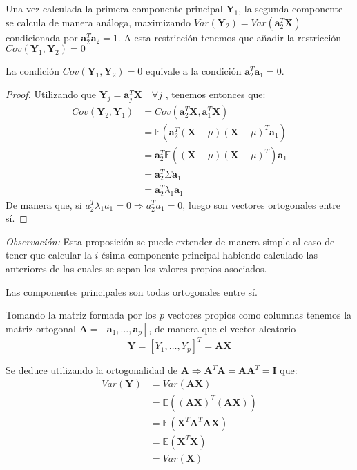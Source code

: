 \noindent Una vez calculada la primera componente principal $\textbf{Y}_1$, la segunda componente se calcula de manera análoga, maximizando $Var(\textbf{Y}_2)=Var(\textbf{a}_2^T\textbf{X})$ condicionada por $\textbf{a}_2^T\textbf{a}_2=1$. A esta restricción tenemos que añadir la restricción $Cov(\textbf{Y}_1,\textbf{Y}_2)=0 $

\begin{propo}
La condición $Cov(\textbf{Y}_1,\textbf{Y}_2)=0 $ equivale a la condición $\textbf{a}_2^T\textbf{a}_1 = 0$.
\begin{proof}
Utilizando que $\textbf{Y}_j=\textbf{a}_j^T \textbf{X}\quad \forall j$ , tenemos entonces que:
\begin{align*}
Cov(\textbf{Y}_2,\textbf{Y}_1)&= Cov (\textbf{a}_2^T\textbf{X},\textbf{a}_1^T\textbf{X})\\ 
&= \mathbb{E}(\textbf{a}_2^T(\textbf{X}-\mu)(\textbf{X}-\mu)^T \textbf{a}_1)\\
&= \textbf{a}_2^T \mathbb{E}((\textbf{X}-\mu)(\textbf{X}-\mu)^T) \textbf{a}_1\\
&= \textbf{a}_2^T \Sigma \textbf{a}_1 \\
&= \textbf{a}_2^T \lambda_1 \textbf{a}_1
\end{align*}
\noindent De manera que, si $a_2^T \lambda_1 a_1 = 0 \Rightarrow a_2^T a_1=0 $, luego son vectores ortogonales entre sí.
\end{proof}
\end{propo}


\noindent \emph{Observación: } Esta proposición se puede extender de manera simple al caso de tener que calcular la $i$-ésima componente principal habiendo calculado las anteriores de las cuales se sepan los valores propios asociados. 

\begin{coro}
Las componentes principales son todas ortogonales entre sí. 
\end{coro}
\noindent Tomando la matriz formada por los $p$ vectores propios como columnas tenemos la matriz ortogonal $\textbf{A}=[\textbf{a}_1,\ldots, \textbf{a}_p]$, de manera que el vector aleatorio 
$$\textbf{Y}=[Y_1,\ldots , Y_p]^T=\textbf{A}\textbf{X}$$

\noindent Se deduce utilizando la ortogonalidad de $\textbf{A}\Rightarrow \textbf{A}^T\textbf{A}=\textbf{A}\textbf{A}^T=\textbf{I}$ que:
\begin{align*}
Var(\textbf{Y})&=Var(\textbf{AX})\\
&=\mathbb{E}((\textbf{AX})^T(\textbf{AX}))\\
&=\mathbb{E}(\textbf{X}^T\textbf{A}^T\textbf{A}\textbf{X})\\
&=\mathbb{E}(\textbf{X}^T\textbf{X})\\
&=Var(\textbf{X})
\end{align*} 

